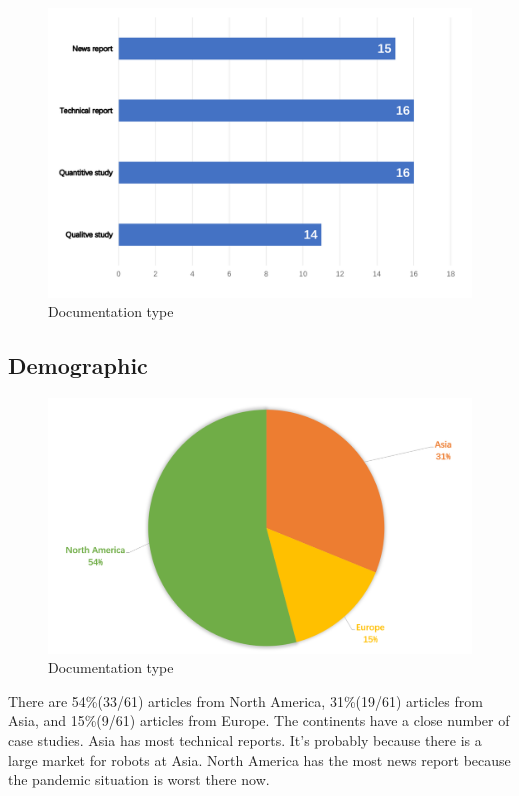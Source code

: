 \documentclass[a4paper]{article}
\begin{document}
\begin{figure}[H]
    \centering
    \includegraphics[scale=0.25]{Type.png}
    \caption{Documentation type}
    \label{Documentation type}
\end{figure}
\subsection{Demographic}
\begin{figure}[H]
    \centering
    \includegraphics[scale=0.2]{Demographic.png}
    \caption{Documentation type}
    \label{Demographic}
\end{figure}
    There are 54\%(33/61) articles from North America, 31\%(19/61) articles from Asia, and 15\%(9/61) articles from Europe. The continents have a close number of case studies.  Asia has most technical reports. It's probably because there is a large market for robots at Asia. North America has the most news report because the pandemic situation is worst there now. 
\end{document}
